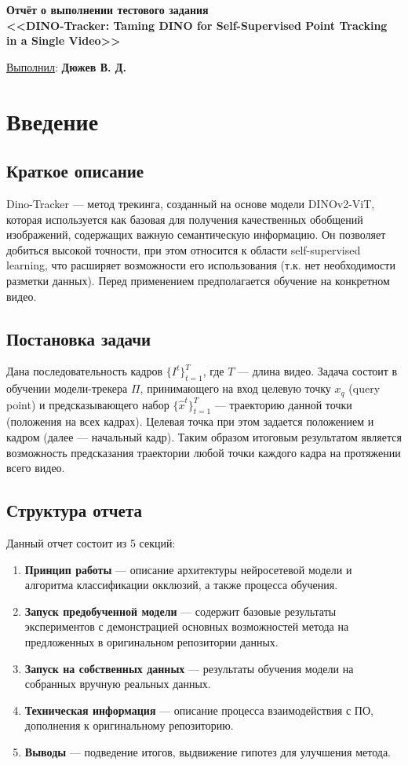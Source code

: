 \documentclass[a4paper, 14pt]{extarticle}
\theoremstyle{definition}
\theoremstyle{plain}
\theoremstyle{remark}
\newcommand*{\titlePage}{
	\thispagestyle{title}
	\begingroup
	\begin{center}
		\vspace*{3ex}
		{\small
		}
		
		\vspace*{2ex}
		
		{\normalsize
		}
		
		\vspace*{30ex}
		
		{\Large \bfseries 
			Отчёт о выполнении тестового задания\\
			{\large <<DINO-Tracker: Taming DINO for Self-Supervised
			Point Tracking in a Single Video>>\\
				}
			
		}
		
	\end{center}
	\vspace*{10ex}
	\begin{flushright}
		{\large 
			\underline{Выполнил}: \textbf{Дюжев В. Д.}
		}

	\end{flushright}	
	\newpage
	\setcounter{page}{1}
	\endgroup}
\begin{document}
\renewcommand{\contentsname}{\hfillОГЛАВЛЕНИЕ\hfill} 
\titlePage
\thispagestyle{plain}
\tableofcontents
\pagestyle{style}

\newpage
\setcounter{page}{1}


\section{Введение}
\subsection{Краткое описание}
Dino-Tracker --- метод трекинга, созданный на основе модели DINOv2-ViT, которая используется как базовая для получения качественных обобщений изображений, содержащих важную семантическую информацию. Он позволяет добиться высокой точности, при этом относится к области self-supervised learning, что расширяет возможности его использования (т.к. нет необходимости разметки данных). Перед применением предполагается обучение на конкретном видео.

\subsection{Постановка задачи}
Дана последовательность кадров $\{I^t\}^T_{t=1}$, где $T$ --- длина видео. Задача состоит в обучении модели-трекера $\Pi$, принимающего на вход целевую точку $x_q$ (query point) и предсказывающего набор $\{\hat{x}^t\}^T_{t=1}$ --- траекторию данной точки (положения на всех кадрах). Целевая точка при этом задается положением и кадром (далее --- начальный кадр).
Таким образом итоговым результатом является возможность предсказания траектории любой точки каждого кадра на протяжении всего видео.

\subsection{Структура отчета}
Данный отчет состоит из 5 секций:
\begin{enumerate}
	\item \textbf{Принцип работы} --- описание архитектуры нейросетевой модели и алгоритма классификации окклюзий, а также процесса обучения.
	\item \textbf{Запуск предобученной модели} --- содержит базовые результаты экспериментов с демонстрацией основных возможностей метода на предложенных в оригинальном репозитории данных.
	\item \textbf{Запуск на собственных данных} --- результаты обучения модели на собранных вручную реальных данных.
	\item \textbf{Техническая информация} --- описание процесса взаимодействия с ПО, дополнения к оригинальному репозиторию.
	\item \textbf{Выводы} --- подведение итогов, выдвижение гипотез для улучшения метода.
\end{enumerate}
\end{document}
